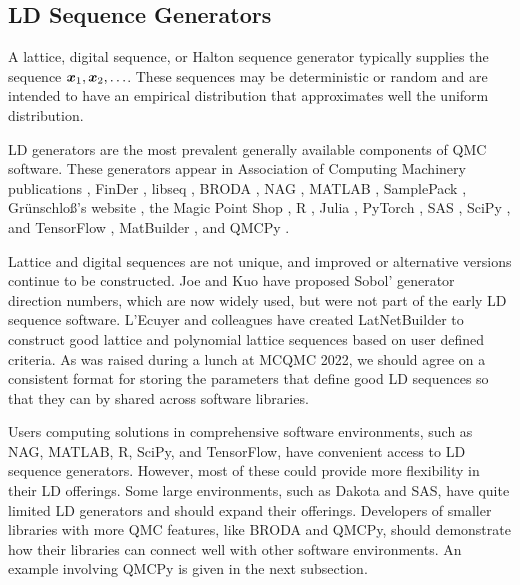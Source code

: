\documentclass[graybox]{svmult}
\begin{document}
\subsection{LD Sequence Generators} A lattice, digital sequence, or Halton sequence generator typically supplies the sequence ${\boldsymbol{x}}_1, {\boldsymbol{x}}_2, \ldots$.  These sequences may be deterministic or random and are intended to have an empirical distribution that approximates well the uniform distribution.

LD generators are the most prevalent generally available components of QMC software.  These generators appear in Association of Computing Machinery  publications \cite{BraFox88,BraFoxNie92,HonHic00a}, FinDer \cite{PasTra95,FinDer}, libseq \cite{FriKel02,FriKelweb}, BRODA \cite{BRODA20a}, NAG \cite{NAG27}, MATLAB \cite{MAT9.13}, SamplePack \cite{SamplePack}, Gr\"unschlo{\ss}'s website \cite{GruWeb}, the Magic Point Shop \cite{NuyWeb}, R \cite{QRNG2020}, Julia \cite{QMCJulia}, PyTorch \cite{paszke2019pytorch}, SAS \cite{SAS_LD}, SciPy \cite{virtanen2020scipy}, and TensorFlow \cite{tfqfQMC2021a}, MatBuilder \cite{paulin2022}, and  QMCPy \cite{QMCPy2020a}.

Lattice and digital sequences are not unique, and improved or alternative versions continue to be constructed.  Joe and Kuo \cite{JoeKuo03,JoeKuo08,SobolDirection} have proposed  Sobol' generator direction numbers, which are now widely used, but were not part of the early LD sequence software.  L'Ecuyer and colleagues have created LatNetBuilder \cite{LatNet} to construct good lattice and polynomial lattice sequences based on user defined criteria. As was raised during a lunch at MCQMC 2022, we should agree on a consistent format for storing the parameters that define good LD sequences so that they can by shared across software libraries.

Users computing solutions in comprehensive software environments, such as NAG, MATLAB, R, SciPy, and TensorFlow, have convenient access to LD sequence generators.  However, most of these could provide more flexibility in their LD offerings.  Some large environments, such as  Dakota \cite{DakotaUsersManual} and SAS, have quite limited LD generators and should expand their offerings.  Developers of smaller libraries with more QMC features, like BRODA and QMCPy, should demonstrate how their libraries can connect well with other software environments.  An example involving QMCPy is given in the next subsection.
\end{document}

